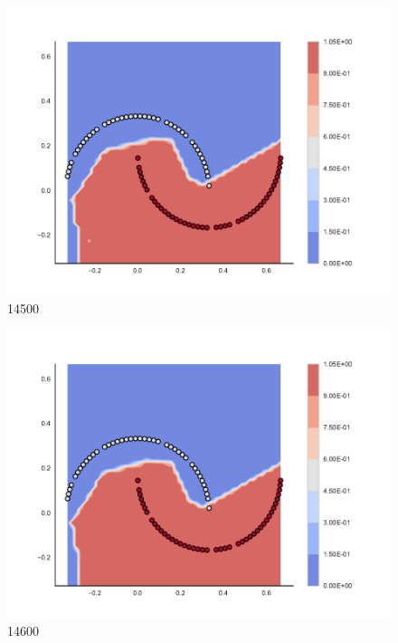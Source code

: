 \begin{subfigure}[b]{0.09\textwidth}
    \includegraphics[clip, trim=2.35cm 1.75cm 4.5cm 0cm,width=\textwidth]{img/convergence/14500.pdf}
    \caption{14500}
    \label{fig:convergence_14500}
\end{subfigure}
%
\begin{subfigure}[b]{0.09\textwidth}
    \includegraphics[clip, trim=2.35cm 1.75cm 4.5cm 0cm,width=\textwidth]{img/convergence/14600.pdf}
    \caption{14600}
    \label{fig:convergence_14600}
\end{subfigure}
%
